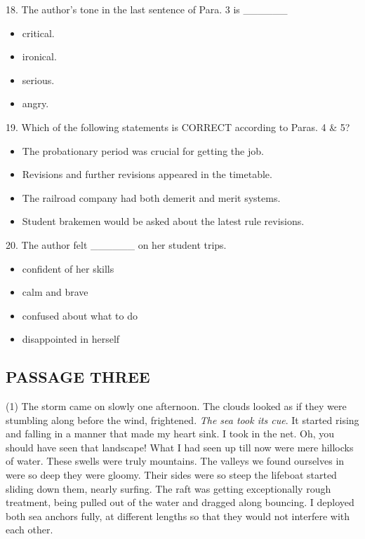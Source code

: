 \documentclass[UTF8,11pt]{ctexart}
\begin{document}
18. The author’s tone in the last sentence of Para. 3 is \_\_\_\_\_\_


\begin{itemize}[leftmargin=2em,itemsep=.2em,topsep=.4em]\item[A.] critical.
\item[B.] ironical.
\item[C.] serious.
\item[D.] angry.
\end{itemize}

19. Which of the following statements is CORRECT according to Paras. 4 \& 5?


\begin{itemize}[leftmargin=2em,itemsep=.2em,topsep=.4em]\item[A.] The probationary period was crucial for getting the job.
\item[B.] Revisions and further revisions appeared in the timetable.
\item[C.] The railroad company had both demerit and merit systems.
\item[D.] Student brakemen would be asked about the latest rule revisions.
\end{itemize}

20. The author felt \_\_\_\_\_\_ on her student trips.


\begin{itemize}[leftmargin=2em,itemsep=.2em,topsep=.4em]\item[A.] confident of her skills
\item[B.] calm and brave
\item[C.] confused about what to do
\item[D.] disappointed in herself
\end{itemize}

\subsection*{\textbf{PASSAGE THREE}}


(1) The storm came on slowly one afternoon. The clouds looked as if they were stumbling along before the wind, frightened. \textit{The sea took its cue}. It started rising and falling in a manner that made my heart sink. I took in the net. Oh, you should have seen that landscape! What I had seen up till now were mere hillocks of water. These swells were truly mountains. The valleys we found ourselves in were so deep they were gloomy. Their sides were so steep the lifeboat started sliding down them, nearly surfing. The raft was getting exceptionally rough treatment, being pulled out of the water and dragged along bouncing. I deployed both sea anchors fully, at different lengths so that they would not interfere with each other.
\end{document}
